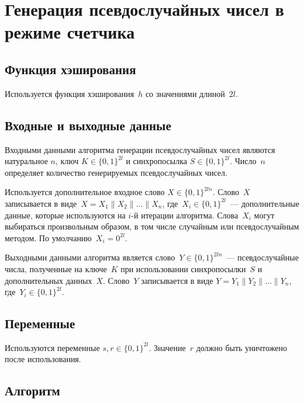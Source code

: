 \section{Генерация псевдослучайных чисел в режиме счетчика}\label{PRNG-CTR}

\subsection{Функция хэширования}

Используется функция хэширования~$h$ со значениями длиной~$2l$.

\subsection{Входные и выходные данные}

Входными данными алгоритма генерации псевдослучайных чисел являются 
натуральное $n$, ключ $K\in\{0,1\}^{2l}$ 
и синхропосылка $S\in\{0,1\}^{2l}$. 
Число~$n$ определяет количество генерируемых псевдослучайных чисел.

Используется дополнительное входное слово $X\in\{0,1\}^{2ln}$.
Слово~$X$ записывается в виде~$X=X_1\parallel X_2\parallel\ldots\parallel X_n$,
где~$X_i\in\{0,1\}^{2l}$~--- дополнительные данные,
которые используются на $i$-й итерации алгоритма.
Слова~$X_i$ могут выбираться произвольным образом, 
в том числе случайным или псевдослучайным методом.
По умолчанию~$X_i=0^{2l}$.

Выходными данными алгоритма является слово~$Y\in\{0,1\}^{2ln}$~---
псевдослучайные числа, полученные на ключе~$K$ при использовании
синхропосылки~$S$ и дополнительных данных~$X$. 
Слово~$Y$ записывается в виде
$Y=Y_1\parallel Y_2\parallel\ldots\parallel Y_n$, 
где~$Y_i\in\{0,1\}^{2l}$.

\subsection{Переменные}

Используются переменные $s, r\in\{0,1\}^{2l}$.
%
Значение~$r$ должно быть уничтожено после использования.

\subsection{Алгоритм}

